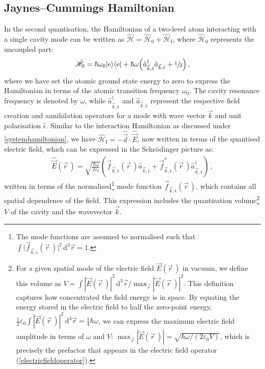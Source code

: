 \documentclass[../Thesis-IJspeert.tex]{subfiles}
\begin{document}
\subsection{Jaynes--Cummings Hamiltonian}
In the second quantisation, the Hamiltonian of a two-level atom interacting with a single cavity mode can be written as $\hat{\mathcal{H}}=\hat{\mathcal{H}}_0+\hat{\mathcal{H}}_\mathrm{I}$, where $\hat{\mathcal{H}}_0$ represents the uncoupled part:
\begin{align}
\label{uncoupledham}
\hat{\mathcal{H}}_0=\hbar \omega_0 \vert \mathrm{e} \rangle \langle \mathrm{e} \vert + \hbar \omega \left( \hat{a}^\dagger_{\vec{k},\hat{\epsilon}} \hat{a}_{\vec{k},\hat{\epsilon}} + \sfrac{1}{2} \right)\,,
\end{align}
where we have set the atomic ground state energy to zero to express the Hamiltonian in terms of the atomic transition frequency $\omega_0$. The cavity resonance frequency is denoted by $\omega$, while $\hat{a}^\dagger_{\vec{k},\hat{\epsilon}}$ and $\hat{a}_{\vec{k},\hat{\epsilon}}$ represent the respective field creation and annihilation operators for a mode with wave vector $\vec{k}$ and unit polarisation $\hat{\epsilon}$. Similar to the interaction Hamiltonian as discussed under \autoref{systemhamiltonian}, we have $\hat{\mathcal{H}}_\mathrm{I}=-\hat{\vec{d}}\cdot \hat{\vec{E}}$, now written in terms of the quantised electric field, which can be expressed in the Schr\"{o}dinger picture as:
\begin{align}
\label{electricfieldoperator}
\hat{\vec{E}}(\vec{r}\,) = \sqrt{\frac{\hbar \omega}{2 \varepsilon_0}} \left(\vec{f}_{\vec{k},\hat{\epsilon}}(\vec{r}\,) \hat{a}_{\vec{k},\hat{\epsilon}}  + \vec{f}^*_{\vec{k},\hat{\epsilon}}(\vec{r}\,) \hat{a}^\dagger_{\vec{k},\hat{\epsilon}} \right)\,,
\end{align}
written in terms of the normalised\footnote{The mode functions are assumed to normalised such that $\int \lvert \vec{f}_{\vec{k},\hat{\epsilon}}(\vec{r}\,)\rvert^2 \, \mathrm{d}^3 \vec{r}=1$.} mode function $\vec{f}_{\vec{k},\hat{\epsilon}}(\vec{r}\,)$, which contains all spatial dependence of the field.
\iffalse
This expression includes the quantisation volume\footnote{For a given spatial mode of the electric field $\vec{E}(\vec{r}\,)$ in vacuum, we define this volume as $V = \int |\vec{E}(\vec{r}\,)|^2 \, \mathrm{d}^3\vec{r} / \max_{\vec{r}} |\vec{E}(\vec{r}\,)|^2$. This definition captures how concentrated the field energy is in space. By equating the energy stored in the electric field to half the zero-point energy, $ \frac{1}{2} \varepsilon_0 \int |\vec{E}(\vec{r}\,)|^2 \, \mathrm{d}^3\vec{r} = \frac{1}{4} \hbar \omega $, we can express the maximum electric field amplitude in terms of $\omega$ and $V$: $\max_{\vec{r}} |\vec{E}(\vec{r}\,)| = \sqrt{ \hbar \omega / (2 \varepsilon_0 V) }$, which is precisely the prefactor that appears in the electric field operator (\autoref{electricfieldoperator}).} $V$ of the cavity and the wavevector $\vec{k}$.
\end{document}
